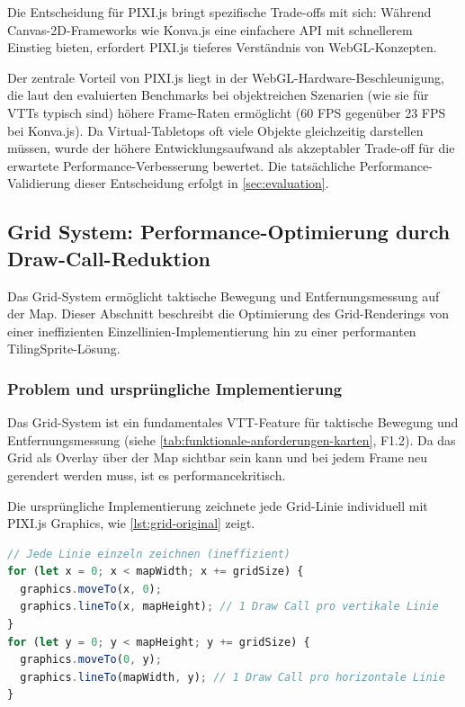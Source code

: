 Die Entscheidung für PIXI.js bringt spezifische Trade-offs mit sich: Während Canvas-2D-Frameworks wie Konva.js eine einfachere \ac{API} mit schnellerem Einstieg bieten, erfordert PIXI.js tieferes Verständnis von \ac{WebGL}-Konzepten.

Der zentrale Vorteil von PIXI.js liegt in der \ac{WebGL}-Hardware-Beschleunigung, die laut den evaluierten Benchmarks bei objektreichen Szenarien (wie sie für VTTs typisch sind) höhere Frame-Raten ermöglicht (60 \ac{FPS} gegenüber 23 \ac{FPS} bei Konva.js). Da Virtual-Tabletops oft viele Objekte gleichzeitig darstellen müssen, wurde der höhere Entwicklungsaufwand als akzeptabler Trade-off für die erwartete Performance-Verbesserung bewertet. Die tatsächliche Performance-Validierung dieser Entscheidung erfolgt in \autoref{sec:evaluation}.

\subsection{Grid System: Performance-Optimierung durch Draw-Call-Reduktion}
\label{subsec:grid-system}

Das Grid-System ermöglicht taktische Bewegung und Entfernungsmessung auf der Map. Dieser Abschnitt beschreibt die Optimierung des Grid-Renderings von einer ineffizienten Einzellinien-Implementierung hin zu einer performanten TilingSprite-Lösung.

\subsubsection{Problem und ursprüngliche Implementierung}

Das Grid-System ist ein fundamentales \ac{VTT}-Feature für taktische Bewegung und Entfernungsmessung (siehe \autoref{tab:funktionale-anforderungen-karten}, F1.2). Da das Grid als Overlay über der Map sichtbar sein kann und bei jedem Frame neu gerendert werden muss, ist es performancekritisch.

Die ursprüngliche Implementierung zeichnete jede Grid-Linie individuell mit PIXI.js Graphics, wie \autoref{lst:grid-original} zeigt.

\begin{lstlisting}[float,language=TypeScript,caption={Ursprüngliche Grid-Implementierung mit individuellen Linien},label=lst:grid-original]
// Jede Linie einzeln zeichnen (ineffizient)
for (let x = 0; x < mapWidth; x += gridSize) {
  graphics.moveTo(x, 0);
  graphics.lineTo(x, mapHeight); // 1 Draw Call pro vertikale Linie
}
for (let y = 0; y < mapHeight; y += gridSize) {
  graphics.moveTo(0, y);
  graphics.lineTo(mapWidth, y); // 1 Draw Call pro horizontale Linie
}
\end{lstlisting}

